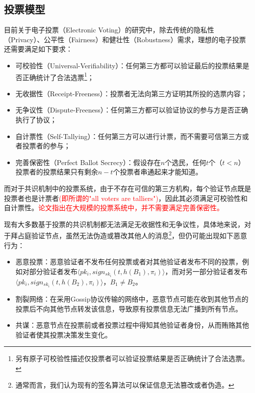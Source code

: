 \subsection{投票模型}
目前关于电子投票（Electronic Voting）的研究中\cite{kiayias2002self}，除去传统的隐私性（Privacy）、公平性（Fairness）和健壮性（Robustness）需求，理想的电子投票还需要满足如下要求：
\begin{itemize}
	\item 可校验性（Universal-Verifiability）：任何第三方都可以验证最后的投票结果是否正确统计了合法选票\footnote{另有原子可校验性描述仅投票者可以验证投票结果是否正确统计了合法选票。}；
	\item 无收据性（Receipt-Freeness）：投票者无法向第三方证明其所投的选票内容；
	\item 无争议性（Dispute-Freeness）：任何第三方都可以验证协议的参与方是否正确执行了协议；
	\item 自计票性（Self-Tallying）：任何第三方可以进行计票，而不需要可信第三方或者投票者的参与；
	\item 完善保密性（Perfect Ballot Secrecy）：假设存在$n$个选民，任何$t$个（$t<n$）投票者的投票结果只有剩余$n-t$个投票者串通起来才能知道。
\end{itemize}

而对于共识机制中的投票系统，由于不存在可信的第三方机构，每个验证节点既是投票者也是计票者\textcolor{red}{(即所谓的"all voters are talliers")}，因此其必须满足可校验性和自计票性。\textcolor{red}{论文\cite{kiayias2002self}指出在大规模的投票系统中，并不需要满足完善保密性。}

现有大多数基于投票的共识机制都无法满足无收据性和无争议性，具体地来说，对于拜占庭验证节点，虽然无法伪造或篡改其他人的消息\footnote{通常而言，我们认为现有的签名算法可以保证信息无法篡改或者伪造。}，但仍可能出现如下恶意行为：

\begin{itemize}
	\item 恶意投票：恶意验证者不发布任何投票或者对其他验证者发布不同的投票，例如对部分验证者发布$\langle pk_i,sign_{sk_i}(t,h(B_1),\pi_i) \rangle$，而对另一部分验证者发布$\langle pk_i,sign_{sk_i}(t,h(B_2),\pi_i) \rangle$，$B_1 \neq B_2$。
	\item 割裂网络：在采用Gossip协议传输的网络中，恶意节点可能在收到其他节点的投票后不向其他节点转发该信息，导致原有投票信息无法广播到所有节点。
	\item 共谋：恶意节点在投票前或者投票过程中得知其他验证者身份，从而贿赂其他验证者使其投票决策发生变化。
\end{itemize}

